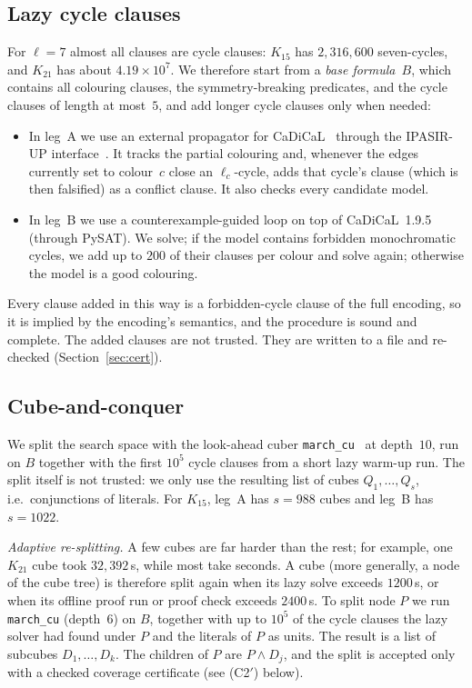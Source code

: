 \documentclass[11pt]{amsart}
\theoremstyle{definition}
\theoremstyle{remark}
\begin{document}
\subsection{Lazy cycle clauses}
For $\ell=7$ almost all clauses are cycle clauses: $K_{15}$ has $2{,}316{,}600$ seven-cycles, and $K_{21}$ has about
$4.19\times10^7$. We therefore start from a \emph{base formula}~$B$, which contains all colouring clauses, the symmetry-breaking
predicates, and the cycle clauses of length at most~$5$, and add longer cycle clauses only when needed:
\begin{itemize}
\item In leg~A we use an external propagator for CaDiCaL~\cite{CaDiCaL2} through the IPASIR-UP interface~\cite{IPASIRUP}. It tracks
the partial colouring and, whenever the edges currently set to colour~$c$ close an $\ell_c$-cycle, adds that cycle's clause (which is
then falsified) as a conflict clause. It also checks every candidate model.
\item In leg~B we use a counterexample-guided loop on top of CaDiCaL~1.9.5 (through PySAT). We solve; if the model contains forbidden
monochromatic cycles, we add up to $200$ of their clauses per colour and solve again; otherwise the model is a good colouring.
\end{itemize}
Every clause added in this way is a forbidden-cycle clause of the full encoding, so it is implied by the encoding's semantics, and
the procedure is sound and complete. The added clauses are not trusted. They are written to a file and re-checked (Section~\ref{sec:cert}).

\subsection{Cube-and-conquer}
We split the search space with the look-ahead cuber \texttt{march\_cu}~\cite{HKWB} at depth~$10$, run on $B$ together with the first
$10^5$ cycle clauses from a short lazy warm-up run. The split itself is not trusted: we only use the resulting list of cubes
$Q_1,\dots,Q_s$, i.e.\ conjunctions of literals. For $K_{15}$, leg~A has $s=988$ cubes and leg~B has $s=1022$.

\emph{Adaptive re-splitting.} A few cubes are far harder than the rest; for example, one $K_{21}$ cube took $32{,}392$\,s, while most
take seconds. A cube (more generally, a node of the cube tree) is therefore split again when its lazy solve exceeds $1200$\,s, or when
its offline proof run or proof check exceeds $2400$\,s. To split node $P$ we run \texttt{march\_cu} (depth~$6$) on $B$, together with up
to $10^5$ of the cycle clauses the lazy solver had found under $P$ and the literals of $P$ as units. The result is a list of subcubes
$D_1,\dots,D_k$. The children of $P$ are $P\wedge D_j$, and the split is accepted only with a checked coverage certificate (see (C2$'$)
below).
\end{document}

